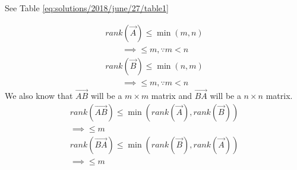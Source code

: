 See Table \ref{eq:solutions/2018/june/27/table1}

\begin{align}
    rank(\vec{A})\leq \min{(m,n)}\\
    \qquad \implies \leq m, \because m<n\\
    rank(\vec{B})\leq \min{(n,m)}\\
    \qquad \implies \leq m, \because m<n
\end{align}
We also know that $\vec{AB}$ will be a $m \times m$ matrix and $\vec{BA}$ will be a $n \times n$ matrix.
\begin{align}
    rank(\vec{AB})\leq \min{(rank(\vec{A}),rank(\vec{B}))}\\
     \implies \leq m\\
     rank(\vec{BA})\leq \min{(rank(\vec{B}),rank(\vec{A}))}\\
      \implies \leq m
\end{align}

